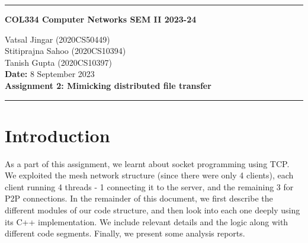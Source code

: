 \documentclass[12pt]{scrartcl}
\begin{document}
\onehalfspacing
\newcommand{\current}{June 2023}
\begin{center}
\hrule
\vspace{.4cm}
{\textbf { \large COL334 Computer Networks SEM II 2023-24}}
\end{center}
{
    \begin{center}
        Vatsal Jingar (2020CS50449)\\ Stitiprajna Sahoo (2020CS10394)\\ Tanish Gupta (2020CS10397)\\
        \textbf{Date:} 8 September 2023 \\
        \textbf{Assignment 2: Mimicking distributed file transfer}
    
    \end{center}
{ 
    \hrule
}
}

\section{Introduction}

As a part of this assignment, we learnt about socket programming using TCP. We exploited the mesh network structure (since there were only 4 clients), each client running 4 threads - 1 connecting it to the server, and the remaining 3 for P2P connections. In the remainder of this document, we first describe the different modules of our code structure, and then look into each one deeply using its C++ implementation. We include relevant details and the logic along with different code segments. Finally, we present some analysis reports.
\end{document}
